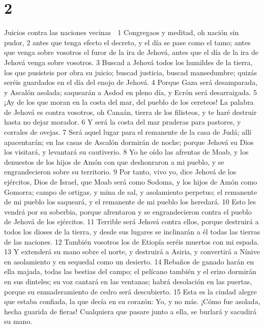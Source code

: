 \chapter{2}

Juicios contra las naciones vecinas

1 Congregaos y meditad, oh nación sin pudor,
2 antes que tenga efecto el decreto, y el día se pase como el tamo; antes que venga sobre vosotros el furor de la ira de Jehová, antes que el día de la ira de Jehová venga sobre vosotros.
3 Buscad a Jehová todos los humildes de la tierra, los que pusisteis por obra su juicio; buscad justicia, buscad mansedumbre; quizás seréis guardados en el día del enojo de Jehová.
4 Porque Gaza será desamparada, y Ascalón asolada; saquearán a Asdod en pleno día, y Ecrón será desarraigada.
5 ¡Ay de los que moran en la costa del mar, del pueblo de los cereteos! La palabra de Jehová es contra vosotros, oh Canaán, tierra de los filisteos,  y te haré destruir hasta no dejar morador.
6 Y será la costa del mar praderas para pastores, y corrales de ovejas.
7 Será aquel lugar para el remanente de la casa de Judá; allí apacentarán; en las casas de Ascalón dormirán de noche; porque Jehová su Dios los visitará, y levantará su cautiverio.
8 Yo he oído las afrentas de Moab,  y los denuestos de los hijos de Amón con que deshonraron a mi pueblo, y se engrandecieron sobre su territorio.
9 Por tanto, vivo yo, dice Jehová de los ejércitos, Dios de Israel, que Moab será como Sodoma, y los hijos de Amón como Gomorra; campo de ortigas, y mina de sal, y asolamiento perpetuo; el remanente de mi pueblo los saqueará, y el remanente de mi pueblo los heredará.
10 Esto les vendrá por su soberbia, porque afrentaron y se engrandecieron contra el pueblo de Jehová de los ejércitos.
11 Terrible será Jehová contra ellos, porque destruirá a todos los dioses de la tierra, y desde sus lugares se inclinarán a él todas las tierras de las naciones.
12 También vosotros los de Etiopía seréis muertos con mi espada.
13 Y extenderá su mano sobre el norte, y destruirá a Asiria, y convertirá a Nínive en asolamiento y en sequedal como un desierto.
14 Rebaños de ganado harán en ella majada, todas las bestias del campo; el pelícano también y el erizo dormirán en sus dinteles; su voz cantará en las ventanas; habrá desolación en las puertas, porque su enmaderamiento de cedro será descubierto.
15 Esta es la ciudad alegre que estaba confiada, la que decía en su corazón: Yo, y no más. ¡Cómo fue asolada, hecha guarida de fieras! Cualquiera que pasare junto a ella, se burlará y sacudirá su mano.

